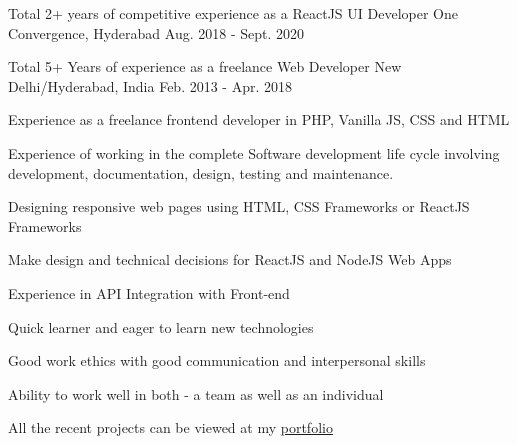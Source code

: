 \begin{cventries}
  \cventry
    {}
    {Total 2+ years of competitive experience as a ReactJS UI Developer}
    {One Convergence, Hyderabad}
    {Aug. 2018 - Sept. 2020}
    {
      \begin{cvitems}
      \end{cvitems}
    }
  \cventry
    {}
    {Total 5+ Years of experience as a freelance Web Developer}
    {New Delhi/Hyderabad, India}
    {Feb. 2013 - Apr. 2018}
    {
      \begin{cvitems}
        \item {Experience as a freelance frontend developer in PHP, Vanilla JS, CSS and HTML}
        \item {Experience of working in the complete Software development life cycle involving development, documentation, design, testing and maintenance.}
        \item {Designing responsive web pages using HTML, CSS Frameworks or ReactJS Frameworks}
        \item {Make design and technical decisions for ReactJS and NodeJS Web Apps}
        \item {Experience in API Integration with Front-end}
        \item {Quick learner and eager to learn new technologies}
        \item {Good work ethics with good communication and interpersonal skills}
        \item {Ability to work well in both - a team as well as an individual}
        \item {All the recent projects can be viewed at my \href{https://hdesign.in/portfolio\#portfolio/All}{\textmd{\color{awesome-skyblue} portfolio}}}
      \end{cvitems}
    }
\end{cventries}
